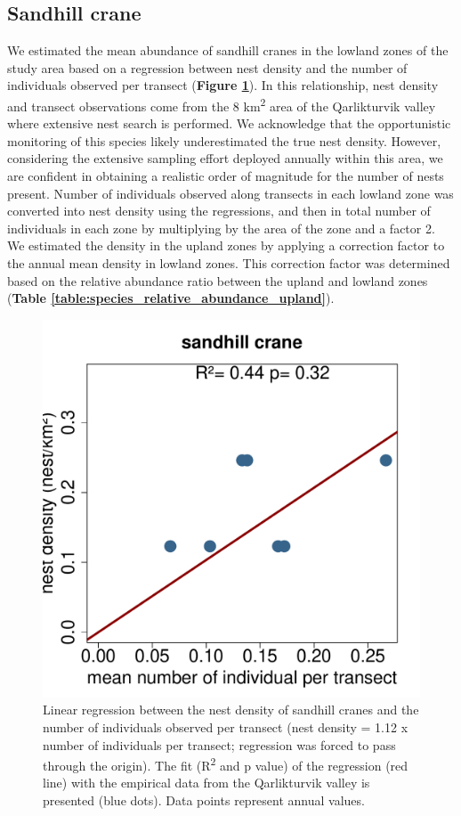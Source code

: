 \documentclass[a4paper,twoside,10pt]{article}
\begin{document}
\subsection{Sandhill crane}
We estimated the mean abundance of sandhill cranes in the lowland zones of the study area based on a regression between nest density and the number of individuals observed per transect (\textbf{Figure \ref{figure:sacr}}). In this relationship, nest density and transect observations come from the 8 km\textsuperscript{2} area of the Qarlikturvik valley where extensive nest search is performed. We acknowledge that the opportunistic monitoring of this species likely underestimated the true nest density. However, considering the extensive sampling effort deployed annually within this area, we are confident in obtaining a realistic order of magnitude for the number of nests present. Number of individuals observed along transects in each lowland zone was converted into nest density using the regressions, and then in total number of individuals in each zone by multiplying by the area of the zone and a factor 2. We estimated the density in the upland zones by applying a correction factor to the annual mean density in lowland zones. This correction factor was determined based on the relative abundance ratio between the upland and lowland zones (\textbf{Table \ref{table:species_relative_abundance_upland}}). 

\begin{figure}[H]
\centering
\includegraphics[width=0.5\linewidth]{figures/sandhill_crane_nest_transects.pdf} 
\caption{Linear regression between the nest density of sandhill cranes and the number of individuals observed per transect (nest density = 1.12 x number of individuals per transect; regression was forced to pass through the origin). The fit (R\textsuperscript{2} and p value) of the regression (red line) with the empirical data from the Qarlikturvik valley is presented (blue dots). Data points represent annual values.}
\label{figure:sacr}
\end{figure}
\end{document}

